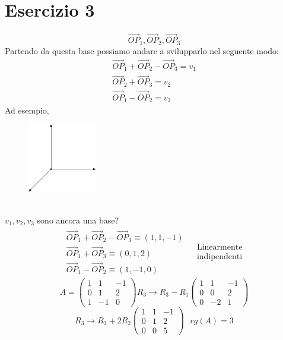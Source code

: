 \section{Esercizio 3}
\label{sec:esercizio3}
\begin{equation*}
  \vec{OP}_1,\vec{OP}_2,\vec{OP}_3
\end{equation*}
Partendo da questa base possiamo andare a svilupparlo nel seguente modo:
\begin{eqnarray*}
  \vec{OP}_1+\vec{OP}_2-\vec{OP}_3=v_1\\
  \vec{OP}_2+\vec{OP}_3=v_2\\
  \vec{OP}_1-\vec{OP}_2=v_3
\end{eqnarray*}
Ad esempio,
  \begin{figure}[ht]
    \centering
    \includegraphics[width=3cm]{img/finiti/es/es1.eps}
  \end{figure}\\
$v_1,v_2,v_3$ sono ancora una base?
\begin{eqnarray*}
  \begin{array}{c}
    \vec{OP}_1+\vec{OP}_2-\vec{OP}_3\equiv (1,1,-1)\\
    \vec{OP}_1+\vec{OP}_3\equiv (0,1,2)\\
    \vec{OP}_1-\vec{OP}_2\equiv (1,-1,0)
  \end{array}&
  \begin{array}{c}
    \text{Linearmente}\\
    \text{indipendenti}
  \end{array}
\end{eqnarray*}
\begin{equation*}
  A=
  \begin{pmatrix}
    1 & 1 &-1\\
    0 & 1 & 2\\
    1 & -1 & 0
  \end{pmatrix} R_3\to R_3-R_1
  \begin{pmatrix}
    1 & 1 &-1\\
    0 & 0 & 2\\
    0 & -2 & 1
  \end{pmatrix}
\end{equation*}
\begin{equation*}
  R_3\to R_3+2R_2
  \begin{pmatrix}
    1 & 1 & -1\\
    0 & 1 & 2\\
    0 & 0 & 5
  \end{pmatrix} \text{ } rg(A)=3
\end{equation*}
